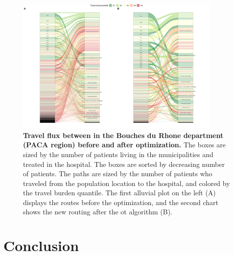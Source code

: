 \begin{figure}[h!]
    \includegraphics[width=0.9\textwidth]{images/routes/fig11.png}
    \centering
    \caption{ \textbf{Travel flux between in the Bouches du Rhone department
            (PACA region) before and after optimization.} The boxes are sized by
        the number of patients living in the municipalities and treated in
        the hospital. The boxes are sorted by decreasing number of patients.
        The paths are sized by the number of patients who traveled from the
        population location to the hospital, and colored by the travel
        burden quantile. The first alluvial plot on the left (A) displays
        the routes before the optimization, and the second chart shows the
        new routing after the \acf{ot} algorithm (B). }
    \label{fig:sinkhorn-alluvium}
\end{figure}

\section{Conclusion}

